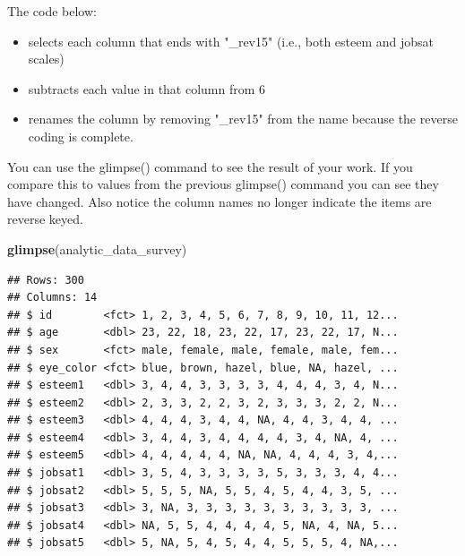 \documentclass[
]{krantz}
\makeatletter
\newenvironment{Shaded}{\begin{snugshade}}{\end{snugshade}}
\newcommand{\DataTypeTok}[1]{\textcolor[rgb]{0.27,0.27,0.27}{#1}}
\newcommand{\DecValTok}[1]{\textcolor[rgb]{0.06,0.06,0.06}{#1}}
\newcommand{\KeywordTok}[1]{\textcolor[rgb]{0.27,0.27,0.27}{\textbf{#1}}}
\newcommand{\NormalTok}[1]{#1}
\newcommand{\OperatorTok}[1]{\textcolor[rgb]{0.43,0.43,0.43}{\textbf{#1}}}
\newcommand{\StringTok}[1]{\textcolor[rgb]{0.5,0.5,0.5}{#1}}
\providecommand{\tightlist}{%
  \setlength{\itemsep}{0pt}\setlength{\parskip}{0pt}}
\newenvironment{kframe}{%
\medskip{}
\setlength{\fboxsep}{.8em}
 \def\at@end@of@kframe{}%
 \ifinner\ifhmode%
  \def\at@end@of@kframe{\end{minipage}}%
  \begin{minipage}{\columnwidth}%
 \fi\fi%
 \def\FrameCommand##1{\hskip\@totalleftmargin \hskip-\fboxsep
 \colorbox{shadecolor}{##1}\hskip-\fboxsep
     \hskip-\linewidth \hskip-\@totalleftmargin \hskip\columnwidth}%
 \MakeFramed {\advance\hsize-\width
   \@totalleftmargin\z@ \linewidth\hsize
   \@setminipage}}%
 {\par\unskip\endMakeFramed%
 \at@end@of@kframe}
\renewenvironment{Shaded}{\begin{kframe}}{\end{kframe}}
\makeatother
\begin{document}
The code below:

\begin{itemize}
\tightlist
\item
  selects each column that ends with "\_rev15" (i.e., both esteem and jobsat scales)
\item
  subtracts each value in that column from 6
\item
  renames the column by removing "\_rev15" from the name because the reverse coding is complete.
\end{itemize}

\begin{Shaded}
\end{Shaded}

You can use the glimpse() command to see the result of your work. If you compare this to values from the previous glimpse() command you can see they have changed. Also notice the column names no longer indicate the items are reverse keyed.

\begin{Shaded}
\begin{Highlighting}[]
\KeywordTok{glimpse}\NormalTok{(analytic_data_survey)}
\end{Highlighting}
\end{Shaded}

\begin{verbatim}
## Rows: 300
## Columns: 14
## $ id        <fct> 1, 2, 3, 4, 5, 6, 7, 8, 9, 10, 11, 12...
## $ age       <dbl> 23, 22, 18, 23, 22, 17, 23, 22, 17, N...
## $ sex       <fct> male, female, male, female, male, fem...
## $ eye_color <fct> blue, brown, hazel, blue, NA, hazel, ...
## $ esteem1   <dbl> 3, 4, 4, 3, 3, 3, 3, 4, 4, 4, 3, 4, N...
## $ esteem2   <dbl> 2, 3, 3, 2, 2, 3, 2, 3, 3, 3, 2, 2, N...
## $ esteem3   <dbl> 4, 4, 4, 3, 4, 4, NA, 4, 4, 3, 4, 4, ...
## $ esteem4   <dbl> 3, 4, 4, 3, 4, 4, 4, 4, 3, 4, NA, 4, ...
## $ esteem5   <dbl> 4, 4, 4, 4, 4, NA, NA, 4, 4, 4, 3, 4,...
## $ jobsat1   <dbl> 3, 5, 4, 3, 3, 3, 3, 5, 3, 3, 3, 4, 4...
## $ jobsat2   <dbl> 5, 5, 5, NA, 5, 5, 4, 5, 4, 4, 3, 5, ...
## $ jobsat3   <dbl> 3, NA, 3, 3, 3, 3, 3, 3, 3, 3, 3, 3, ...
## $ jobsat4   <dbl> NA, 5, 5, 4, 4, 4, 4, 5, NA, 4, NA, 5...
## $ jobsat5   <dbl> 5, NA, 5, 4, 5, 4, 4, 5, 5, 5, 4, NA,...
\end{verbatim}
\end{document}
